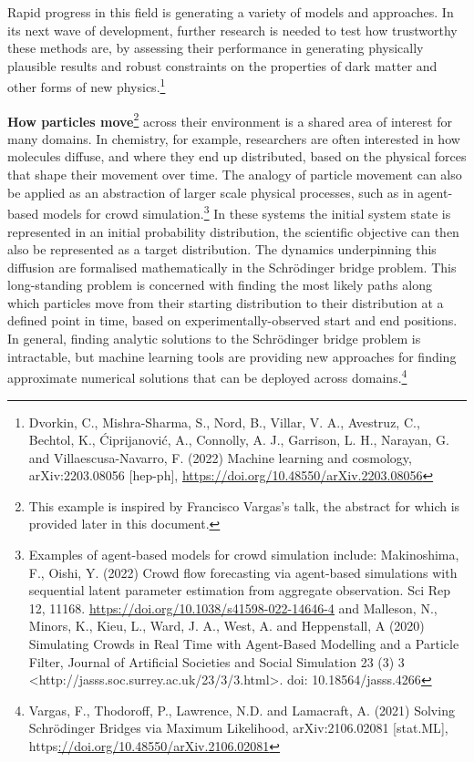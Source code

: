 Rapid progress in this field is generating a variety of models and
approaches. In its next wave of development, further research is needed
to test how trustworthy these methods are, by assessing their
performance in generating physically plausible results and robust
constraints on the properties of dark matter and other forms of new
physics.\footnote{Dvorkin, C., Mishra-Sharma, S., Nord, B., Villar, V.
  A., Avestruz, C., Bechtol, K., Ćiprijanović, A., Connolly, A. J.,
  Garrison, L. H., Narayan, G. and Villaescusa-Navarro, F. (2022)
  Machine learning and cosmology, arXiv:2203.08056 {[}hep-ph{]},
  \url{https://doi.org/10.48550/arXiv.2203.08056}}

\textbf{How particles move}\footnote{This example is inspired by
  Francisco Vargas's talk, the abstract for which is provided later in
  this document.} across their environment is a shared area of interest
for many domains. In chemistry, for example, researchers are often
interested in how molecules diffuse, and where they end up distributed,
based on the physical forces that shape their movement over time. The
analogy of particle movement can also be applied as an abstraction of
larger scale physical processes, such as in agent-based models for crowd
simulation.\footnote{Examples of agent-based models for crowd simulation
  include: Makinoshima, F., Oishi, Y. (2022) Crowd flow forecasting via
  agent-based simulations with sequential latent parameter estimation
  from aggregate observation. Sci Rep 12, 11168.
  \href{https://doi.org/10.1038/s41598-022-14646-4}{\uline{https://doi.org/10.1038/s41598-022-14646-4}}
  and Malleson, N., Minors, K., Kieu, L., Ward, J. A., West, A. and
  Heppenstall, A (2020) Simulating Crowds in Real Time with Agent-Based
  Modelling and a Particle Filter, Journal of Artificial Societies and
  Social Simulation 23 (3) 3
  \textless http://jasss.soc.surrey.ac.uk/23/3/3.html\textgreater. doi:
  10.18564/jasss.4266} In these systems the initial system state is
represented in an initial probability distribution, the scientific
objective can then also be represented as a target distribution. The
dynamics underpinning this diffusion are formalised mathematically in
the Schrödinger bridge problem. This long-standing problem is concerned
with finding the most likely paths along which particles move from their
starting distribution to their distribution at a defined point in time,
based on experimentally-observed start and end positions. In general,
finding analytic solutions to the Schrödinger bridge problem is
intractable, but machine learning tools are providing new approaches for
finding approximate numerical solutions that can be deployed across
domains.\footnote{Vargas, F., Thodoroff, P., Lawrence, N.D. and
  Lamacraft, A. (2021) Solving Schrödinger Bridges via Maximum
  Likelihood, arXiv:2106.02081 {[}stat.ML{]},
  https\uline{://doi.org/10.48550/arXiv.2106.02081}}

